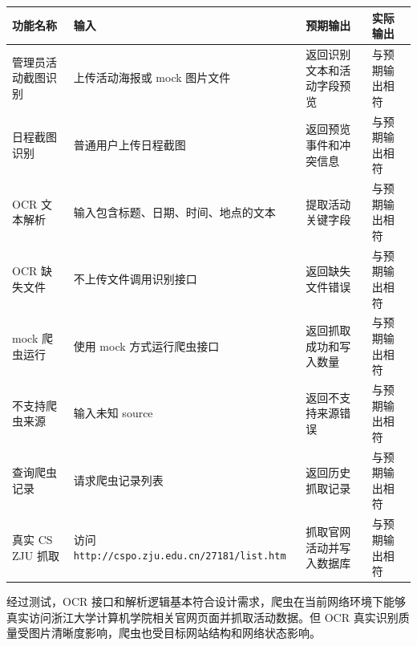 {\def\LTcaptype{none} %
\begin{longtable}[]{@{}|
  >{\raggedright\arraybackslash}p{}|
  >{\raggedright\arraybackslash}p{}|
  >{\raggedright\arraybackslash}p{}|
  >{\raggedright\arraybackslash}p{}|@{}}
\hline
\rowcolor{gray!12}
\begin{minipage}[b]{\linewidth}\raggedright
\bfseries 功能名称
\end{minipage} & \begin{minipage}[b]{\linewidth}\raggedright
\bfseries 输入
\end{minipage} & \begin{minipage}[b]{\linewidth}\raggedright
\bfseries 预期输出
\end{minipage} & \begin{minipage}[b]{\linewidth}\raggedright
\bfseries 实际输出
\end{minipage} \\
\hline
\endhead
\hline
\endlastfoot
管理员活动截图识别 & 上传活动海报或 mock 图片文件 &
返回识别文本和活动字段预览 & 与预期输出相符 \\
\hline
日程截图识别 & 普通用户上传日程截图 & 返回预览事件和冲突信息 &
与预期输出相符 \\
\hline
OCR 文本解析 & 输入包含标题、日期、时间、地点的文本 & 提取活动关键字段 &
与预期输出相符 \\
\hline
OCR 缺失文件 & 不上传文件调用识别接口 & 返回缺失文件错误 &
与预期输出相符 \\
\hline
mock 爬虫运行 & 使用 mock 方式运行爬虫接口 & 返回抓取成功和写入数量 &
与预期输出相符 \\
\hline
不支持爬虫来源 & 输入未知 source & 返回不支持来源错误 &
与预期输出相符 \\
\hline
查询爬虫记录 & 请求爬虫记录列表 & 返回历史抓取记录 & 与预期输出相符 \\
\hline
真实 CS ZJU 抓取 & 访问
\passthrough{\lstinline!http://cspo.zju.edu.cn/27181/list.htm!} &
抓取官网活动并写入数据库 & 与预期输出相符 \\
\hline
\end{longtable}
}

经过测试，OCR
接口和解析逻辑基本符合设计需求，爬虫在当前网络环境下能够真实访问浙江大学计算机学院相关官网页面并抓取活动数据。但
OCR 真实识别质量受图片清晰度影响，爬虫也受目标网站结构和网络状态影响。

